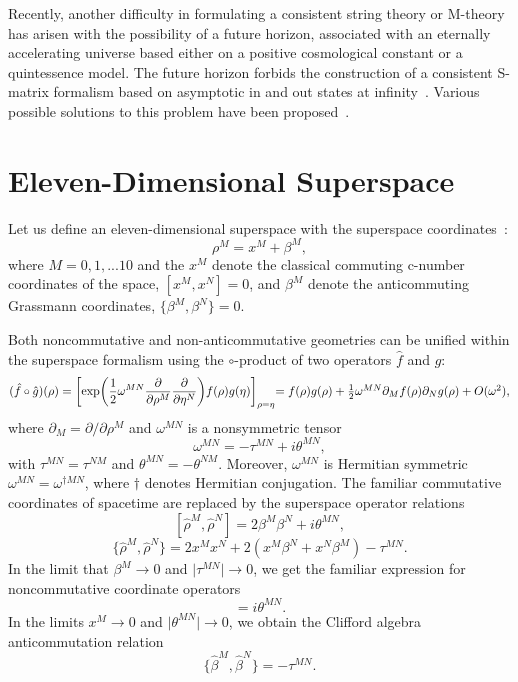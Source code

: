 \documentclass[a4paper,12pt]{article}
\begin{document}
Recently, another difficulty in formulating a consistent string theory or
M-theory has arisen with the possibility of a future horizon, associated
with an eternally accelerating universe based either on a positive
cosmological constant or a quintessence model. The future horizon forbids
the construction of a consistent S-matrix formalism based on asymptotic in
and out states at infinity~\cite{Susskind,Witten}.
Various possible solutions to this problem have been
proposed~\cite{Moffat4,Cline}.

\section{\bf Eleven-Dimensional Superspace}

Let us define an eleven-dimensional superspace with the superspace
coordinates~\cite{Moffat}:
\begin{equation}
\rho^M=x^M+\beta^M,
\end{equation}
where $M=0,1,...10$ and the $x^M$ denote the classical commuting
c-number coordinates of the space, $[x^M,x^N]=0$, and $\beta^M$ denote
the anticommuting Grassmann coordinates, $\{\beta^M,\beta^N\}=0$.

Both noncommutative and non-anticommutative geometries can be unified
within the superspace formalism using the $\circ$-product of two
operators ${\hat f}$ and ${\hat g}$:
\begin{equation}
\label{fgproduct}
({\hat f}\circ{\hat g})(\rho)
=\biggl[\exp\biggl(\frac{1}{2}\omega^{MN}
\frac{\partial}{\partial\rho^M}\frac{\partial}{\partial\eta^N}\biggr)
f(\rho)g(\eta)\biggr]_{\rho=\eta} $$ $$
=f(\rho)g(\rho)+\frac{1}{2}\omega^{MN}\partial_M
f(\rho)\partial_Ng(\rho)+O(\omega^2),
\end{equation}
where $\partial_M=\partial/\partial\rho^M$ and $\omega^{MN}$ is a
nonsymmetric tensor
\begin{equation}
\omega^{MN}=-\tau^{MN}+i\theta^{MN},
\end{equation} with
$\tau^{MN}=\tau^{NM}$ and $\theta^{MN}=-\theta^{NM}$.
Moreover, $\omega^{MN}$ is Hermitian symmetric
$\omega^{MN}=\omega^{\dagger MN}$, where $\dagger$ denotes Hermitian
conjugation. The familiar commutative coordinates of spacetime are replaced
by the superspace operator relations
\begin{equation}
\label{commutator}
[{\hat\rho}^M,{\hat\rho}^N]=2\beta^M\beta^N+i\theta^{MN},
\end{equation}
\begin{equation}
\label{anticommutator}
\{{\hat\rho}^M,{\hat\rho}^N\}=2x^Mx^N+2(x^M\beta^N+x^N\beta^M)-\tau^{MN}.
\end{equation}
In the limit that $\beta^M\rightarrow 0$ and
$\vert\tau^{MN}\vert\rightarrow 0$, we get the familiar expression for
noncommutative coordinate operators
\begin{equation}
[{\hat x}^M,{\hat x}^N]=i\theta^{MN}.
\end{equation}
In the limits $x^M\rightarrow 0$ and $\vert\theta^{MN}\vert\rightarrow 0$,
we obtain the Clifford algebra anticommutation relation
\begin{equation}
\{{\hat\beta}^M,{\hat\beta}^N\}=-\tau^{MN}.
\end{equation}
\end{document}

